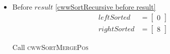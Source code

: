 \begin{frame}[containsverbatim]{\cwwalgortihmexampleframe}
\begin{columns}[c]
\begin{column}{0.65\textwidth}
{\begin{minipage}[c]{\textwidth}
\begin{multicols}{3}
\begin{itemize}
                                    \item Before $result$ \cref{cwwSortRecursive before result}
                                    \begin{align*}
                                        leftSorted & = \begin{bmatrix}0\end{bmatrix} \\
                                        rightSorted & = \begin{bmatrix}8\end{bmatrix}
                                    \end{align*}
        
                                    Call \textsc{cwwSortMergePos}
                                \end{itemize}
                            \end{multicols}
                        \end{minipage}
                    }
                \end{column}
            \end{columns}
        \end{frame}

